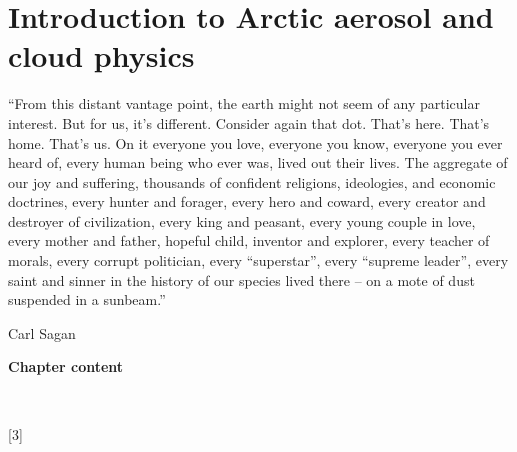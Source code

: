 \makeatother
{}
\setcounter{counterchapter}{1}

\chapter{Introduction to Arctic aerosol and cloud physics}  

\label{chap1}

\epigraph{\justifying``From this distant vantage point, the earth might not seem of any particular interest. But for us, it's different. Consider again that dot. That's here. That's home. That's us. On it everyone you love, everyone you know, everyone you ever heard of, every human being who ever was, lived out their lives. The aggregate of our joy and suffering, thousands of confident religions, ideologies, and economic doctrines, every hunter and forager, every hero and coward, every creator and destroyer of civilization, every king and peasant, every young couple in love, every mother and father, hopeful child, inventor and explorer, every teacher of morals, every corrupt politician, every ``superstar'', every ``supreme leader'', every saint and sinner in the history of our species lived there – on a mote of dust suspended in a sunbeam.''}{Carl Sagan} 

\newpage
\vspace*{\fill}
\begin{singlespace}
\textbf{Chapter content}
    
~

\startcontents[chapters]
    [3]{}
\end{singlespace} 
\vspace*{\fill}
\newpage


